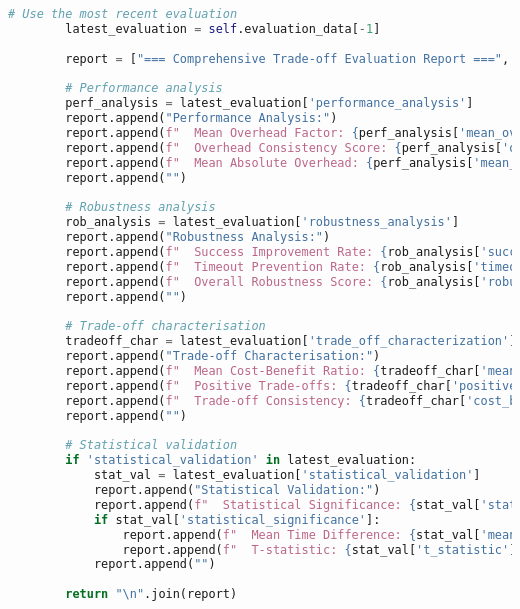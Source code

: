 \begin{lstlisting}[language=Python, caption=Multi-dimensional Trade-off Analysis and Characterisation]
        # Use the most recent evaluation
        latest_evaluation = self.evaluation_data[-1]
        
        report = ["=== Comprehensive Trade-off Evaluation Report ===", ""]
        
        # Performance analysis
        perf_analysis = latest_evaluation['performance_analysis']
        report.append("Performance Analysis:")
        report.append(f"  Mean Overhead Factor: {perf_analysis['mean_overhead_factor']:.3f}")
        report.append(f"  Overhead Consistency Score: {perf_analysis['overhead_consistency_score']:.3f}")
        report.append(f"  Mean Absolute Overhead: {perf_analysis['mean_absolute_overhead']:.3f}s")
        report.append("")
        
        # Robustness analysis
        rob_analysis = latest_evaluation['robustness_analysis']
        report.append("Robustness Analysis:")
        report.append(f"  Success Improvement Rate: {rob_analysis['success_improvement_rate']:.2%}")
        report.append(f"  Timeout Prevention Rate: {rob_analysis['timeout_prevention_rate']:.2%}")
        report.append(f"  Overall Robustness Score: {rob_analysis['robustness_score']:.3f}")
        report.append("")
        
        # Trade-off characterisation
        tradeoff_char = latest_evaluation['trade_off_characterization']
        report.append("Trade-off Characterisation:")
        report.append(f"  Mean Cost-Benefit Ratio: {tradeoff_char['mean_cost_benefit_ratio']:.3f}")
        report.append(f"  Positive Trade-offs: {tradeoff_char['positive_trade_offs']}/{tradeoff_char['total_trade_offs']}")
        report.append(f"  Trade-off Consistency: {tradeoff_char['cost_benefit_consistency']:.3f}")
        report.append("")
        
        # Statistical validation
        if 'statistical_validation' in latest_evaluation:
            stat_val = latest_evaluation['statistical_validation']
            report.append("Statistical Validation:")
            report.append(f"  Statistical Significance: {stat_val['statistical_significance']}")
            if stat_val['statistical_significance']:
                report.append(f"  Mean Time Difference: {stat_val['mean_time_difference']:.3f}s")
                report.append(f"  T-statistic: {stat_val['t_statistic']:.3f}")
            report.append("")
        
        return "\n".join(report)
\end{lstlisting}

